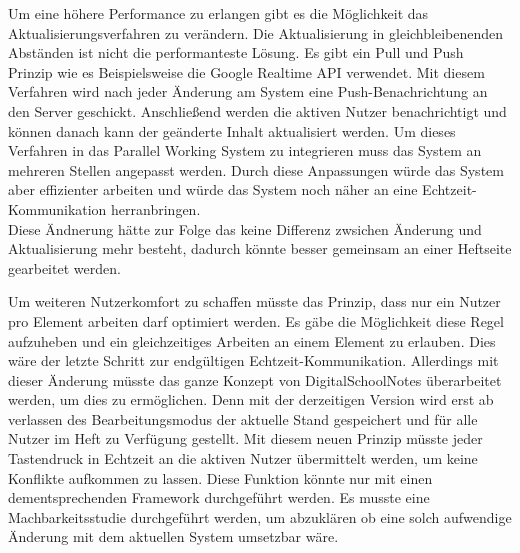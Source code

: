 Um eine höhere Performance zu erlangen gibt es die Möglichkeit das Aktualisierungsverfahren zu verändern. Die Aktualisierung in gleichbleibenenden Abständen ist nicht die performanteste Lösung. Es gibt ein Pull und Push Prinzip wie es Beispielsweise die Google Realtime API verwendet. Mit diesem Verfahren wird nach jeder Änderung am System eine Push-Benachrichtung an den Server geschickt. Anschließend werden die aktiven Nutzer benachrichtigt und können danach kann der geänderte Inhalt aktualisiert werden.
\newpage
Um dieses Verfahren in das Parallel Working System zu integrieren muss das System an mehreren Stellen angepasst werden. Durch diese Anpassungen würde das System aber effizienter arbeiten und würde das System noch näher an eine Echtzeit-Kommunikation herranbringen.\\
Diese Ändnerung hätte zur Folge das keine Differenz zwsichen Änderung und Aktualisierung mehr besteht, dadurch könnte besser gemeinsam an einer Heftseite gearbeitet werden.

Um weiteren Nutzerkomfort zu schaffen müsste das Prinzip, dass nur ein Nutzer pro Element arbeiten darf optimiert werden. Es gäbe die Möglichkeit diese Regel aufzuheben und ein gleichzeitiges Arbeiten an einem Element zu erlauben. Dies wäre der letzte Schritt zur endgültigen Echtzeit-Kommunikation. Allerdings mit dieser Änderung müsste das ganze Konzept von DigitalSchoolNotes überarbeitet werden, um dies zu ermöglichen. Denn mit der derzeitigen Version wird erst ab verlassen des Bearbeitungsmodus der aktuelle Stand gespeichert und für alle Nutzer im Heft zu Verfügung gestellt. Mit diesem neuen Prinzip müsste jeder Tastendruck in Echtzeit an die aktiven Nutzer übermittelt werden, um keine Konflikte aufkommen zu lassen. Diese Funktion könnte nur mit einen dementsprechenden Framework durchgeführt werden. Es musste eine Machbarkeitsstudie durchgeführt werden, um abzuklären ob eine solch aufwendige Änderung mit dem aktuellen System umsetzbar wäre.